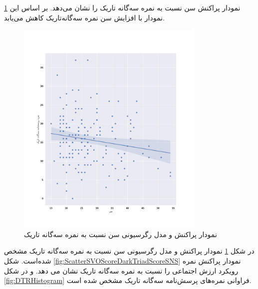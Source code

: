\ref{fig:ScatterDTRAgeSNS}
نمودار پراکنش سن نسبت به نمره سه‌گانه تاریک را نشان می‌دهد. بر اساس این نمودار با افزایش سن نمره سه‌گانه‌تاریک کاهش می‌یابد.
\begin{figure}[htpb]
    \centering
    \includegraphics[width=0.8\textwidth]{./img/ScatterDTRAgeSNS.png}
    \caption{نمودار پراکنش و مدل رگرسیونی سن نسبت به نمره سه‌گانه تاریک}
    \label{fig:ScatterDTRAgeSNS}
\end{figure}
در شکل
\ref{fig:ScatterDTRAgeSNS}
نمودار پراکنش و مدل رگرسیونی سن نسبت به نمره سه‌گانه تاریک مشخص شده‌است.
شکل
\ref{fig:ScatterSVOScoreDarkTriadScoreSNS}
نمودار پراکنش نمره رویکرد ارزش اجتماعی را نسبت به نمره سه‌گانه تاریک نشان می دهد.
و در شکل
\ref{fig:DTRHistogram}
فراوانی نمره‌های پرسش‌نامه سه‌گانه تاریک مشخص شده است.

